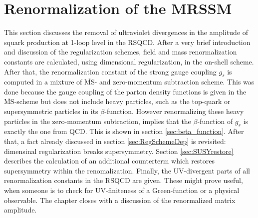 \section{Renormalization of the MRSSM}\label{sec:renMRSSM}
This section discusses the removal of ultraviolet divergences in the amplitude of squark production at 1-loop level in the RSQCD. After a very brief introduction and discussion of the regularization schemes, field and mass renormalization constants are calculated, using dimensional regularization, in the on-shell scheme. After that, the renormalization constant of the strong gauge coupling $g_s$ is computed in a mixture of $\overline{\mathrm{MS}}$- and zero-momentum subtraction scheme. This was done because the gauge coupling of the parton density functions is given in the $\overline{\mathrm{MS}}$-scheme but does not include heavy particles, such as the top-quark or supersymmetric particles in its $\beta$-function. However renormalizing these heavy particles in the zero-momentum subtraction, implies that the $\beta$-function of $g_s$ is exactly the one from QCD. This is shown in section \ref{sec:beta_function}. After that, a fact already discussed in section \ref{sec:RegSchemeDep} is revisited: dimensinal regularization breaks supersymmetry. Section \ref{sec:SUSYrestore} describes the calculation of an additional counterterm which restores supersymmetry within the renomalization. Finally, the UV-divergent parts of all renormalization constants in the RSQCD are given. These might prove useful, when someone is to check for UV-finiteness of a Green-function or a physical observable. The chapter closes with a discussion of the renormalized matrix amplitude.

